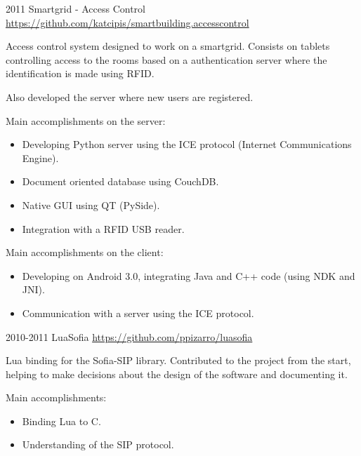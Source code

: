 \documentclass[]{friggeri-cv} %
\begin{document}
\begin{entrylist}
\entry
{2011}
{Smartgrid - Access Control}
{\href{https://github.com/katcipis/smartbuilding.accesscontrol}{https://github.com/katcipis/smartbuilding.accesscontrol}}
{

Access control system designed to work on a smartgrid. Consists on tablets controlling access to the rooms based on
a authentication server where the identification is made using RFID.

Also developed the server where new users are registered.

Main accomplishments on the server:\\
\begin{itemize}
\item Developing Python server using the ICE protocol (Internet Communications Engine).
\item Document oriented database using CouchDB.
\item Native GUI using QT (PySide).
\item Integration with a RFID USB reader.
\end{itemize}

Main accomplishments on the client:\\
\begin{itemize}
\item Developing on Android 3.0, integrating Java and C++ code (using NDK and JNI).
\item Communication with a server using the ICE protocol.
\end{itemize}
}
\end{entrylist}

\begin{entrylist}
\entry
{2010-2011}
{LuaSofia}
{\href{https://github.com/ppizarro/luasofia}{https://github.com/ppizarro/luasofia}}
{

Lua binding for the Sofia-SIP library.
Contributed to the project from the start, helping to make decisions about the design of the software and documenting it.

Main accomplishments:\\
\begin{itemize}
\item Binding Lua to C.
\item Understanding of the SIP protocol.
\end{itemize}
}
\end{entrylist}
\end{document}
